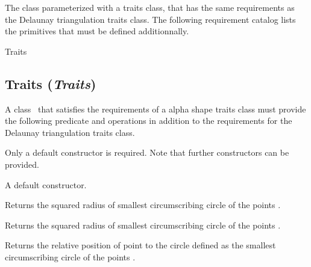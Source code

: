 The class  parameterized with a
traits class, that has the same requirements as the Delaunay
triangulation traits class.  The following requirement catalog lists
the primitives that must be defined additionnally.

\begin{ccClass} {Traits}
\subsection*{Traits (\mbox{\it Traits})}


\ccDefinition
A class \ccClassName\ that satisfies the requirements of a alpha shape
traits class must provide the following predicate and operations in
addition to the requirements for the Delaunay triangulation traits
class.

\ccTypes


\ccCreation

Only a default constructor is required. Note that further constructors
can be provided. 

{A default constructor.}


\ccOperations

{Returns the squared radius of smallest circumscribing circle of the
points . }

{Returns the squared radius of smallest circumscribing circle of the
points . }

{Returns the relative position of point  to the circle
defined as the smallest circumscribing circle of the points .}

\end{ccClass}

